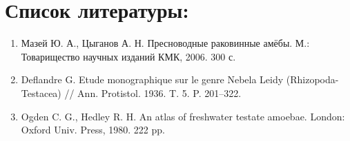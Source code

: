 \documentclass[12pt, a4paper]{article}
\begin{document}
\section*{Список литературы:}

\begin{enumerate}
  \item Мазей Ю. А., Цыганов А. Н. Пресноводные раковинные амёбы. М.: Товарищество научных изданий КМК, 2006. 300 с. \label{reference1}
  \item Deflandre G. Etude monographique sur le genre Nebela Leidy (Rhizopoda-Testacea) // Ann. Protistol. 1936. T. 5. P. 201–322. \label{reference2}
  \item Ogden C. G., Hedley R. H. An atlas of freshwater testate amoebae. London: Oxford Univ. Press, 1980. 222 pp. \label{reference3}
\end{enumerate}
\end{document}
